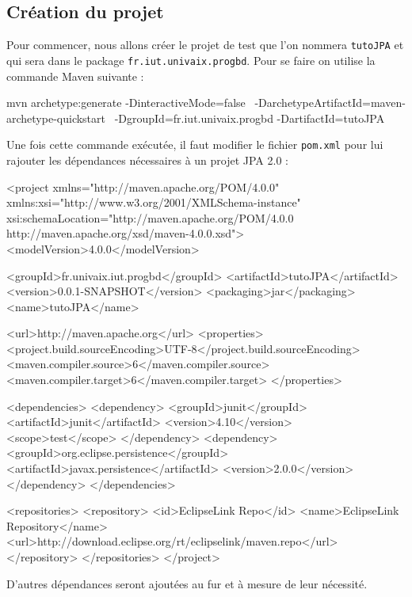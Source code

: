 \documentclass[a4paper,11pt]{article}
\begin{document}
\subsection{Création du projet}
Pour commencer, nous allons créer le projet de test que l'on nommera \texttt{tutoJPA} et qui sera dans le package 
\texttt{fr.iut.univaix.progbd}. Pour se faire on utilise la commande Maven suivante : 
\begin{code_shell}
mvn archetype:generate -DinteractiveMode=false \
-DarchetypeArtifactId=maven-archetype-quickstart \
-DgroupId=fr.iut.univaix.progbd -DartifactId=tutoJPA
\end{code_shell}

Une fois cette commande exécutée, il faut modifier le fichier \texttt{pom.xml} pour lui rajouter les dépendances 
nécessaires à un projet JPA 2.0 :
\begin{code_xml}
<project xmlns="http://maven.apache.org/POM/4.0.0" 
         xmlns:xsi="http://www.w3.org/2001/XMLSchema-instance"
	       xsi:schemaLocation="http://maven.apache.org/POM/4.0.0 
	                           http://maven.apache.org/xsd/maven-4.0.0.xsd">
	<modelVersion>4.0.0</modelVersion>
	
	<groupId>fr.univaix.iut.progbd</groupId>
	<artifactId>tutoJPA</artifactId>
	<version>0.0.1-SNAPSHOT</version>
	<packaging>jar</packaging>
	<name>tutoJPA</name>
	
	<url>http://maven.apache.org</url>
	<properties>
		<project.build.sourceEncoding>UTF-8</project.build.sourceEncoding>
		<maven.compiler.source>6</maven.compiler.source>
		<maven.compiler.target>6</maven.compiler.target>
	</properties>
	
	<dependencies>
		<dependency>
			<groupId>junit</groupId>
			<artifactId>junit</artifactId>
			<version>4.10</version>
			<scope>test</scope>
		</dependency>
		<dependency>
			<groupId>org.eclipse.persistence</groupId>
			<artifactId>javax.persistence</artifactId>
			<version>2.0.0</version>
		</dependency>
	</dependencies>
	
	<repositories>
		<repository>
			<id>EclipseLink Repo</id>
			<name>EclipseLink Repository</name>
			<url>http://download.eclipse.org/rt/eclipselink/maven.repo</url>
		</repository>
	</repositories>
</project>
\end{code_xml}
D'autres dépendances seront ajoutées au fur et à mesure de leur nécessité.
\end{document}
